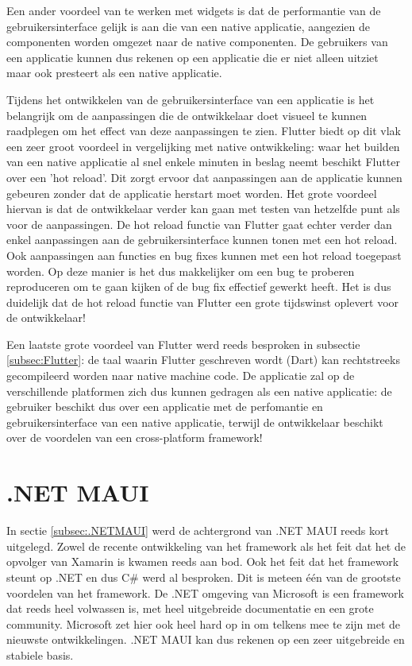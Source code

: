 Een ander voordeel van te werken met widgets is dat de performantie van de gebruikersinterface gelijk is aan die van een native applicatie, aangezien de componenten worden omgezet naar de native componenten. De gebruikers van een applicatie kunnen dus rekenen op een applicatie die er niet alleen uitziet maar ook presteert als een native applicatie.

Tijdens het ontwikkelen van de gebruikersinterface van een applicatie is het belangrijk om de aanpassingen die de ontwikkelaar doet visueel te kunnen raadplegen om het effect van deze aanpassingen te zien. Flutter biedt op dit vlak een zeer groot voordeel in vergelijking met native ontwikkeling: waar het builden van een native applicatie al snel enkele minuten in beslag neemt beschikt Flutter over een 'hot reload'. Dit zorgt ervoor dat aanpassingen aan de applicatie kunnen gebeuren zonder dat de applicatie herstart moet worden. Het grote voordeel hiervan is dat de ontwikkelaar verder kan gaan met testen van hetzelfde punt als voor de aanpassingen. De hot reload functie van Flutter gaat echter verder dan enkel aanpassingen aan de gebruikersinterface kunnen tonen met een hot reload. Ook aanpassingen aan functies en bug fixes kunnen met een hot reload toegepast worden. Op deze manier is het dus makkelijker om een bug te proberen reproduceren om te gaan kijken of de bug fix effectief gewerkt heeft. Het is dus duidelijk dat de hot reload functie van Flutter een grote tijdswinst oplevert voor de ontwikkelaar!

Een laatste grote voordeel van Flutter werd reeds besproken in subsectie \ref{subsec:Flutter}: de taal waarin Flutter geschreven wordt (Dart) kan rechtstreeks gecompileerd worden naar native machine code. De applicatie zal op de verschillende platformen zich dus kunnen gedragen als een native applicatie: de gebruiker beschikt dus over een applicatie met de perfomantie en gebruikersinterface van een native applicatie, terwijl de ontwikkelaar beschikt over de voordelen van een cross-platform framework!

\section{.NET MAUI}
\label{detailsdotnetMAUI}

In sectie \ref{subsec:.NETMAUI} werd de achtergrond van .NET MAUI reeds kort uitgelegd. Zowel de recente ontwikkeling van het framework als het feit dat het de opvolger van Xamarin is kwamen reeds aan bod. Ook het feit dat het framework steunt op .NET en dus C\# werd al besproken. Dit is meteen één van de grootste voordelen van het framework. De .NET omgeving van Microsoft is een framework dat reeds heel volwassen is, met heel uitgebreide documentatie en een grote community. Microsoft zet hier ook heel hard op in om telkens mee te zijn met de nieuwste ontwikkelingen. .NET MAUI kan dus rekenen op een zeer uitgebreide en stabiele basis.

